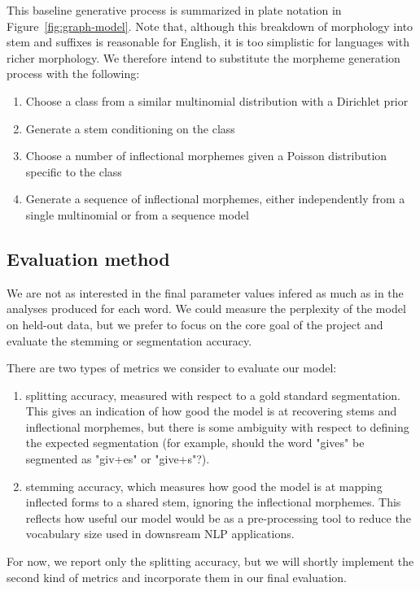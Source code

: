 \documentclass{article}
\begin{document}
This baseline generative process is summarized in plate notation in
Figure~\ref{fig:graph-model}. Note that, although this breakdown of
morphology into stem and suffixes is reasonable for English, it is too
simplistic for languages with richer morphology. We therefore intend
to substitute the morpheme generation process with the following:
\begin{enumerate}
    \item Choose a class from a similar multinomial distribution with a Dirichlet prior
    \item Generate a stem conditioning on the class
    \item Choose a number of inflectional morphemes given a Poisson distribution specific to the class
    \item Generate a sequence of inflectional morphemes, either independently from a single multinomial or from a sequence model
\end{enumerate}

\subsection{Evaluation method}

We are not as interested in the final parameter values infered as much
as in the analyses produced for each word. We could measure the
perplexity of the model on held-out data, but we prefer to focus on
the core goal of the project and evaluate the stemming or segmentation
accuracy.

There are two types of metrics we consider to evaluate our model:
\begin{enumerate}
    \item splitting accuracy, measured with respect to a gold standard segmentation. This gives an indication of how good the model is at recovering stems and inflectional morphemes, but there is some ambiguity with respect to defining the expected segmentation (for example, should the word "gives" be segmented as "giv+es" or "give+s"?).
    \item stemming accuracy, which measures how good the model is at mapping inflected forms to a shared stem, ignoring the inflectional morphemes. This reflects how useful our model would be as a pre-processing tool to reduce the vocabulary size used in downsream NLP applications.
\end{enumerate}

For now, we report only the splitting accuracy, but we will shortly implement the second kind of metrics and incorporate them in our final evaluation.
\end{document}
